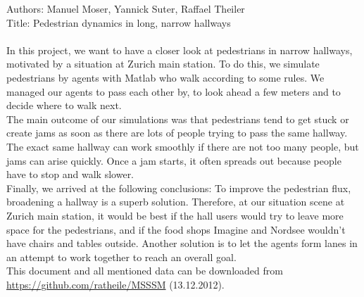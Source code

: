 
Authors: Manuel Moser, Yannick Suter, Raffael Theiler\\
Title: Pedestrian dynamics in long, narrow hallways\\
\\
In this project, we want to have a closer look at pedestrians in narrow hallways, motivated by a situation at Zurich main station. To do this, we simulate pedestrians by agents with Matlab who walk according to some rules. We managed our agents to pass each other by, to look ahead a few meters and to decide where to walk next.\\
The main outcome of our simulations was that pedestrians tend to get stuck or create jams as soon as there are lots of people trying to pass the same hallway. The exact same hallway can work smoothly if there are not too many people, but jams can arise quickly. Once a jam starts, it often spreads out because people have to stop and walk slower.\\
Finally, we arrived at the following conclusions: To improve the pedestrian flux, broadening a hallway is a superb solution. Therefore, at our situation scene at Zurich main station, it would be best if the hall users would try to leave more space for the pedestrians, and if the food shops Imagine and Nordsee wouldn't have chairs and tables outside. Another solution is to let the agents form lanes in an attempt to work together to reach an overall goal.\\

\noi This document and all mentioned data can be downloaded from \url{https://github.com/ratheile/MSSSM} (13.12.2012).
